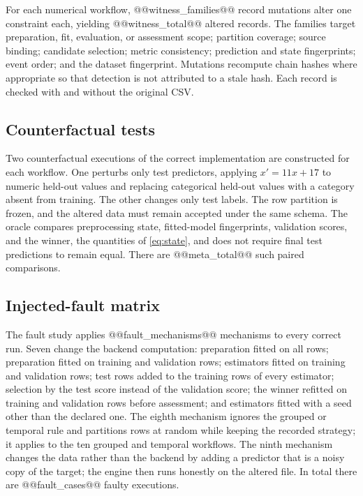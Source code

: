 \documentclass[lettersize,journal]{IEEEtran}
\begin{document}
For each numerical workflow, @@witness_families@@ record mutations alter one constraint each, yielding @@witness_total@@ altered records. The families target preparation, fit, evaluation, or assessment scope; partition coverage; source binding; candidate selection; metric consistency; prediction and state fingerprints; event order; and the dataset fingerprint. Mutations recompute chain hashes where appropriate so that detection is not attributed to a stale hash. Each record is checked with and without the original CSV.

\subsection{Counterfactual tests}
Two counterfactual executions of the correct implementation are constructed for each workflow. One perturbs only test predictors, applying $x'=11x+17$ to numeric held-out values and replacing categorical held-out values with a category absent from training. The other changes only test labels. The row partition is frozen, and the altered data must remain accepted under the same schema. The oracle compares preprocessing state, fitted-model fingerprints, validation scores, and the winner, the quantities of \eqref{eq:state}, and does not require final test predictions to remain equal. There are @@meta_total@@ such paired comparisons.

\subsection{Injected-fault matrix}\label{sec:faultmethod}
The fault study applies @@fault_mechanisms@@ mechanisms to every correct run. Seven change the backend computation: preparation fitted on all rows; preparation fitted on training and validation rows; estimators fitted on training and validation rows; test rows added to the training rows of every estimator; selection by the test score instead of the validation score; the winner refitted on training and validation rows before assessment; and estimators fitted with a seed other than the declared one. The eighth mechanism ignores the grouped or temporal rule and partitions rows at random while keeping the recorded strategy; it applies to the ten grouped and temporal workflows. The ninth mechanism changes the data rather than the backend by adding a predictor that is a noisy copy of the target; the engine then runs honestly on the altered file. In total there are @@fault_cases@@ faulty executions.
\end{document}
